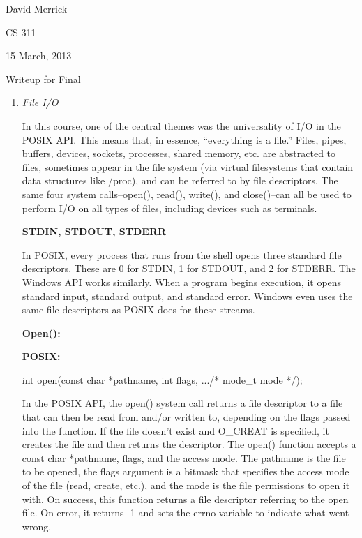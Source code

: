 \documentclass[letterpaper,10pt,titlepage]{article}
\newcommand{\ignore}[2]{\hspace{0in}#2} %
\newcommand{\tab}{\hspace*{2em}} %
\begin{document}
David Merrick

CS 311

15 March, 2013

\begin{center}
{\LARGE Writeup for Final}
\end{center}

\begin{enumerate} 
\item \emph{File I/O}

\tab In this course, one of the central themes was the universality of I/O in the POSIX API. This means that, in essence, ``everything is a file.'' Files, pipes, buffers, devices, sockets, processes, shared memory, etc. are abstracted to files, sometimes appear in the file system (via virtual filesystems that contain data structures like /proc), and can be referred to by file descriptors. The same four system calls--open(), read(), write(), and close()--can all be used to perform I/O on all types of files, including devices such as terminals. \newline

\textbf{STDIN, STDOUT, STDERR} \newline

\tab In POSIX, every process that runs from the shell opens three standard file descriptors. These are 0 for STDIN, 1 for STDOUT, and 2 for STDERR. The Windows API works similarly. When a program begins execution, it opens standard input, standard output, and standard error. Windows even uses the same file descriptors as POSIX does for these streams. \newline

\textbf{Open():}

\textbf{POSIX:}

int open(const char *pathname, int flags, .../* mode\_t mode */);\newline

\tab In the POSIX API, the open() system call returns a file descriptor to a file that can then be read from and/or written to, depending on the flags passed into the function. If the file doesn't exist and O\_CREAT is specified, it creates the file and then returns the descriptor. The open() function accepts a const char *pathname, flags, and the access mode. The pathname is the file to be opened, the flags argument is a bitmask that specifies the access mode of the file (read, create, etc.), and the mode is the file permissions to open it with\ignore{\[TLPI, pg. 72\]}. On success, this function returns a file descriptor referring to the open file. On error, it returns -1 and sets the errno variable to indicate what went wrong. \newline 


\end{enumerate}
\end{document}
